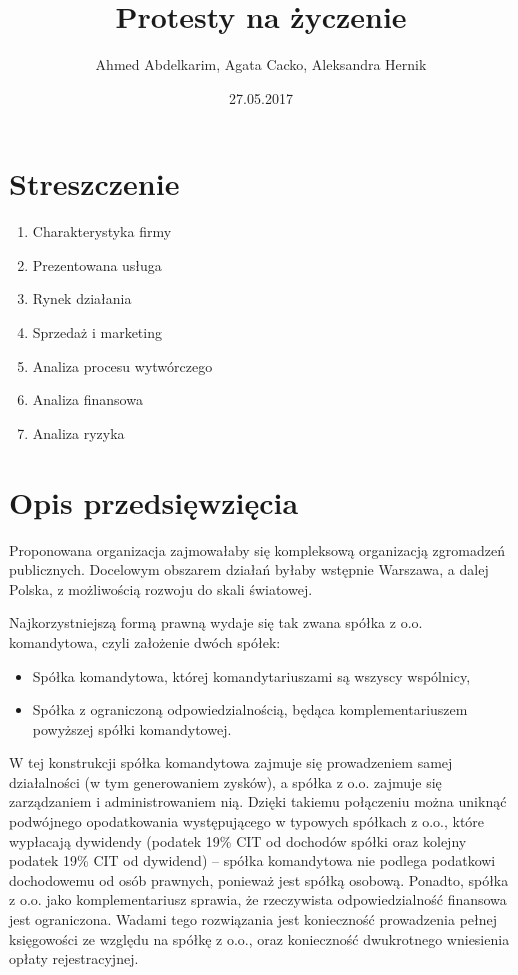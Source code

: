 \documentclass{article}
\title{\Huge{Protesty na życzenie}\\ %
}
\author{\large{Ahmed Abdelkarim, Agata Cacko, Aleksandra Hernik}}
\date{\large{27.05.2017}}
\begin{document}
\maketitle
\vspace{2cm}
\tableofcontents
\newpage




\section{Streszczenie}
\begin{enumerate}
\item Charakterystyka firmy
\item Prezentowana usługa %
\item Rynek działania
\item Sprzedaż i marketing
\item Analiza procesu wytwórczego %
\item Analiza finansowa
\item Analiza ryzyka
\end{enumerate}

\section{Opis przedsięwzięcia}
Proponowana organizacja zajmowałaby się kompleksową organizacją zgromadzeń publicznych. Docelowym obszarem działań byłaby wstępnie Warszawa, a dalej Polska, z możliwością rozwoju do skali światowej.   

Najkorzystniejszą formą prawną wydaje się tak zwana spółka z o.o. komandytowa, czyli założenie dwóch spółek:
\begin{itemize}
\item Spółka komandytowa, której komandytariuszami są wszyscy wspólnicy,
\item Spółka z ograniczoną odpowiedzialnością, będąca komplementariuszem powyższej spółki komandytowej.
\end{itemize}
W tej konstrukcji spółka komandytowa zajmuje się prowadzeniem samej działalności (w tym generowaniem zysków), a spółka z o.o. zajmuje się zarządzaniem i administrowaniem nią. Dzięki takiemu połączeniu można uniknąć podwójnego opodatkowania występującego w typowych spółkach z o.o., które wypłacają dywidendy (podatek 19\% CIT od dochodów spółki oraz kolejny podatek 19\% CIT od dywidend) -- spółka komandytowa nie podlega podatkowi dochodowemu od osób prawnych, ponieważ jest spółką osobową. Ponadto, spółka z o.o. jako komplementariusz sprawia, że rzeczywista odpowiedzialność finansowa jest ograniczona. Wadami tego rozwiązania jest konieczność prowadzenia pełnej księgowości ze względu na spółkę z o.o., oraz konieczność dwukrotnego wniesienia opłaty rejestracyjnej.
\end{document}
